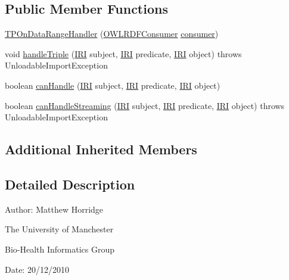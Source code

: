 \subsection*{Public Member Functions}
\begin{DoxyCompactItemize}
\item 
\hyperlink{classorg_1_1coode_1_1owlapi_1_1rdfxml_1_1parser_1_1_t_p_on_data_range_handler_a1ee1404b018df96aeaac270698a21f7c}{T\-P\-On\-Data\-Range\-Handler} (\hyperlink{classorg_1_1coode_1_1owlapi_1_1rdfxml_1_1parser_1_1_o_w_l_r_d_f_consumer}{O\-W\-L\-R\-D\-F\-Consumer} \hyperlink{classorg_1_1coode_1_1owlapi_1_1rdfxml_1_1parser_1_1_abstract_triple_handler_a4ccf4d898ff01eb1cadfa04b23d54e9c}{consumer})
\item 
void \hyperlink{classorg_1_1coode_1_1owlapi_1_1rdfxml_1_1parser_1_1_t_p_on_data_range_handler_a255d99b380f327048fc9c05b476e4bae}{handle\-Triple} (\hyperlink{classorg_1_1semanticweb_1_1owlapi_1_1model_1_1_i_r_i}{I\-R\-I} subject, \hyperlink{classorg_1_1semanticweb_1_1owlapi_1_1model_1_1_i_r_i}{I\-R\-I} predicate, \hyperlink{classorg_1_1semanticweb_1_1owlapi_1_1model_1_1_i_r_i}{I\-R\-I} object)  throws Unloadable\-Import\-Exception 
\item 
boolean \hyperlink{classorg_1_1coode_1_1owlapi_1_1rdfxml_1_1parser_1_1_t_p_on_data_range_handler_ac388e994d052f45ab66785f16a72b192}{can\-Handle} (\hyperlink{classorg_1_1semanticweb_1_1owlapi_1_1model_1_1_i_r_i}{I\-R\-I} subject, \hyperlink{classorg_1_1semanticweb_1_1owlapi_1_1model_1_1_i_r_i}{I\-R\-I} predicate, \hyperlink{classorg_1_1semanticweb_1_1owlapi_1_1model_1_1_i_r_i}{I\-R\-I} object)
\item 
boolean \hyperlink{classorg_1_1coode_1_1owlapi_1_1rdfxml_1_1parser_1_1_t_p_on_data_range_handler_af209ced175af9cb11e1a6d5929a9c861}{can\-Handle\-Streaming} (\hyperlink{classorg_1_1semanticweb_1_1owlapi_1_1model_1_1_i_r_i}{I\-R\-I} subject, \hyperlink{classorg_1_1semanticweb_1_1owlapi_1_1model_1_1_i_r_i}{I\-R\-I} predicate, \hyperlink{classorg_1_1semanticweb_1_1owlapi_1_1model_1_1_i_r_i}{I\-R\-I} object)  throws Unloadable\-Import\-Exception 
\end{DoxyCompactItemize}
\subsection*{Additional Inherited Members}


\subsection{Detailed Description}
Author\-: Matthew Horridge\par
 The University of Manchester\par
 Bio-\/\-Health Informatics Group\par
 Date\-: 20/12/2010 

